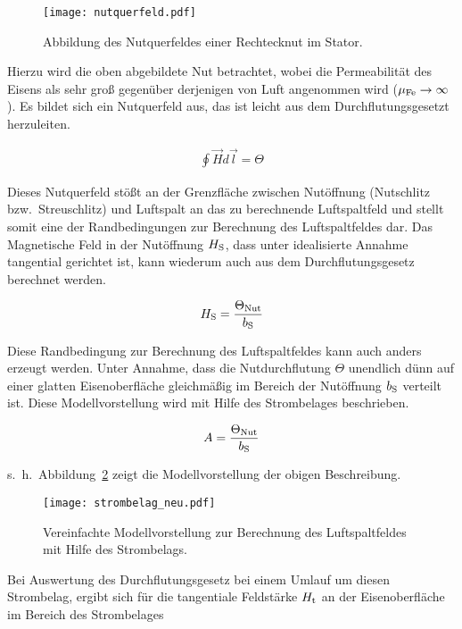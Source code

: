 \begin{figure}[!htb]
\centering
\texttt{[image: nutquerfeld.pdf]}
\label{fig:nutquerfeld}
\caption{Abbildung des Nutquerfeldes einer Rechtecknut im Stator.}
\end{figure}

Hierzu wird die oben abgebildete Nut betrachtet, wobei die Permeabilität des Eisens als sehr groß gegenüber derjenigen von Luft angenommen wird ($\mu_{\mathrm{Fe}} \rightarrow \infty$).
Es bildet sich ein Nutquerfeld aus, das ist leicht aus dem Durchflutungsgesetzt herzuleiten.

\begin{align}
\oint \vec{H}d\vec{l} = \Theta \label{eqn:durchflutungsgesetzt}
\end{align}

Dieses Nutquerfeld stößt an der Grenzfläche zwischen Nutöffnung (Nutschlitz bzw.\ Streuschlitz) und Luftspalt an das zu berechnende Luftspaltfeld und stellt somit eine der Randbedingungen zur Berechnung des Luftspaltfeldes dar.
Das Magnetische Feld in der Nutöffnung $H_{\mathrm{S}}$, dass unter idealisierte Annahme tangential gerichtet ist, kann wiederum auch aus dem Durchflutungsgesetz berechnet werden.

\begin{align}
H_{\mathrm{S}} = \frac{\Theta_{\mathrm{Nut}}}{b_{\mathrm{S}}}
\end{align}

Diese Randbedingung zur Berechnung des Luftspaltfeldes kann auch anders erzeugt werden.
Unter Annahme, dass die Nutdurchflutung $\Theta$ unendlich dünn auf einer glatten Eisenoberfläche gleichmäßig im Bereich der Nutöffnung $b_{\mathrm{S}}$ verteilt ist.
Diese Modellvorstellung wird mit Hilfe des Strombelages beschrieben.

\begin{align}
A = \frac{\Theta_{\mathrm{Nut}}}{b_{\mathrm{S}}}
\end{align}

s.~h.~Abbildung~\ref{fig:strombelag-neu} zeigt die Modellvorstellung der obigen Beschreibung.

\begin{figure}[!h]
\centering
\texttt{[image: strombelag\_neu.pdf]}
\label{fig:strombelag-neu}
\caption{Vereinfachte Modellvorstellung zur Berechnung des Luftspaltfeldes mit Hilfe des Strombelags.}
\end{figure}

Bei Auswertung des Durchflutungsgesetz bei einem Umlauf um diesen Strombelag, ergibt sich für die tangentiale Feldstärke $H_{\mathrm{t}}$ an der Eisenoberfläche im Bereich des Strombelages

